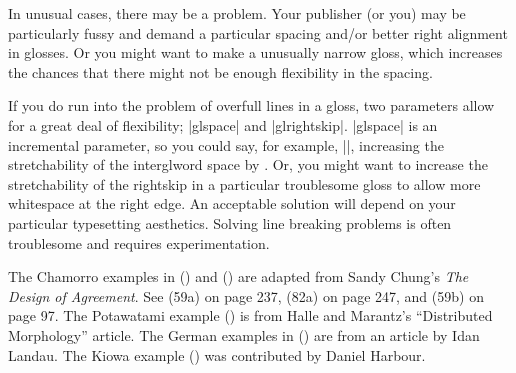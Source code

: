 In unusual cases, there may be a problem.  Your publisher (or
you) may be particularly fussy and demand a particular spacing
and/or better right alignment in glosses.  Or you might want to make a
unusually narrow gloss, which increases the chances that there
might not be enough flexibility in the spacing.

If you do run into the problem of overfull lines in a gloss, two
parameters allow for a great deal of flexibility; |glspace| and
|glrightskip|. |glspace| is an incremental parameter, so you could say,
for example, ||, increasing the
stretchability of the interglword space by \textdim{.2 em}. Or,
you might want to increase the stretchability of the rightskip
in a particular troublesome gloss to allow more whitespace at the
right edge.  An acceptable solution will depend on your
particular typesetting aesthetics. Solving line breaking problems
is often troublesome and requires experimentation.

\medskip
The Chamorro examples in () and ()
are adapted from Sandy Chung's {\it The Design of Agreement}. See
(59a) on page 237, (82a) on page 247, and (59b) on page 97.  The
Potawatami example () is from Halle and Marantz's
``Distributed Morphology'' article. The German examples in
() are from an article by Idan Landau. The Kiowa
example () was contributed by Daniel Harbour.

